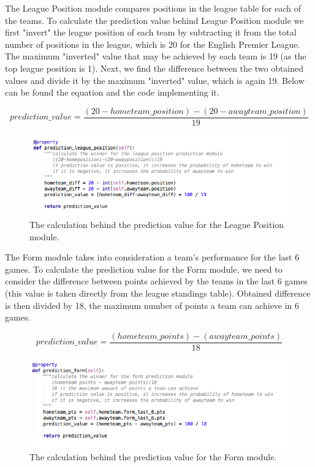The League Position module compares positions in the league table for each of the teams. To calculate the prediction value behind League Position module we first "invert" the league position of each team by subtracting it from the total number of positions in the league, which is 20 for the English Premier League. The maximum "inverted" value that may be achieved by each team is 19 (as the top league position is 1). Next, we find the difference between the two obtained values and divide it by the maximum "inverted" value, which is again 19.  Below can be found the equation and the code implementing it.

\begin{equation}
  prediction\_value = \frac{(20-hometeam\_position)-(20-awayteam\_position)}{19}
\end{equation}

\begin{figure}[H]
	\begin{center}
		\includegraphics[width=.80\textwidth]{impl/images/predictionLeaguePosition}
		\caption{The calculation behind the prediction value for the League Position module.} \label{fig:using: predictionleagueposition}
	\end{center}
\end{figure}
The Form module takes into consideration a team’s performance for the last 6 games. To calculate the prediction value for the Form module, we need to consider the difference between points achieved by the teams in the last 6 games (this value is taken directly from the league standings table). Obtained difference is then divided by 18, the maximum number of points a team can achieve in 6 games.

\begin{equation}
  prediction\_value = \frac{(hometeam\_points)-(awayteam\_points)}{18}
\end{equation}


\begin{figure}[H]
	\begin{center}
		\includegraphics[width=.80\textwidth]{impl/images/predictionForm}
		\caption{The calculation behind the prediction value for the Form module.} \label{fig:using: predictionform}
	\end{center}
\end{figure}

